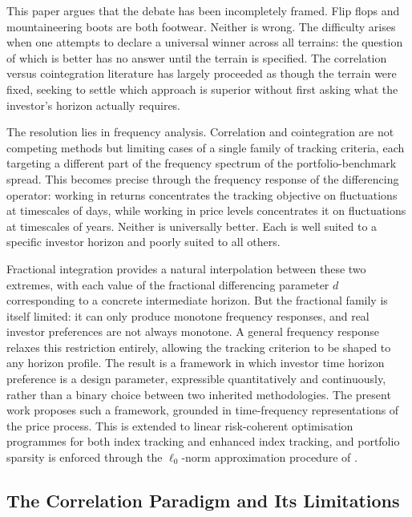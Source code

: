 \documentclass[12pt,a4paper]{article}
\begin{document}
This paper argues that the debate has been incompletely framed. Flip
flops and mountaineering boots are both footwear. Neither is wrong.
The difficulty arises when one attempts to declare a universal winner
across all terrains: the question of which is better has no answer
until the terrain is specified. The correlation versus cointegration
literature has largely proceeded as though the terrain were fixed,
seeking to settle which approach is superior without first asking
what the investor's horizon actually requires.

The resolution lies in frequency analysis. Correlation and cointegration
are not competing methods but limiting cases of a single family of
tracking criteria, each targeting a different part of the frequency
spectrum of the portfolio-benchmark spread. This becomes precise through
the frequency response of the differencing operator: working in returns
concentrates the tracking objective on fluctuations at timescales of
days, while working in price levels concentrates it on fluctuations at
timescales of years. Neither is universally better. Each is well suited
to a specific investor horizon and poorly suited to all others.

Fractional integration provides a natural interpolation between these two
extremes, with each value of the fractional differencing parameter $d$
corresponding to a concrete intermediate horizon. But the fractional
family is itself limited: it can only produce monotone frequency
responses, and real investor preferences are not always monotone. A
general frequency response relaxes this restriction entirely, allowing
the tracking criterion to be shaped to any horizon profile. The result
is a framework in which investor time horizon preference is a design
parameter, expressible quantitatively and continuously, rather than a
binary choice between two inherited methodologies. The present work
proposes such a framework, grounded in time-frequency representations
of the price process. This is extended to linear risk-coherent
optimisation programmes \citep{ArtznerDelbaenEberHeath1999} for both index tracking and enhanced index
tracking, and portfolio sparsity is enforced through the $\ell_0$-norm
approximation procedure of \citet{BenidisFengPalomar2018}.

\subsection{The Correlation Paradigm and Its Limitations}
\end{document}
